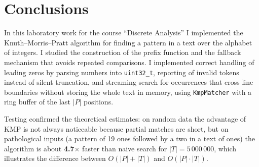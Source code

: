 \section{Conclusions}

In this laboratory work for the course \enquote{Discrete Analysis}
I implemented the Knuth--Morris--Pratt algorithm for finding a pattern in a text over the
alphabet of integers. I studied the construction of the prefix function and the fallback
mechanism that avoids repeated comparisons. I implemented correct handling of leading zeros
by parsing numbers into \texttt{uint32\_t}, reporting of invalid tokens instead of silent
truncation, and streaming search for occurrences that cross line boundaries without storing
the whole text in memory, using \texttt{KmpMatcher} with a ring buffer of the last $|P|$ positions.

Testing confirmed the theoretical estimates: on random data the advantage of KMP is not always
noticeable because partial matches are short, but on pathological inputs
(a pattern of 19 ones followed by a two in a text of ones) the algorithm is
about \textbf{4.7$\times$} faster than naive search for $|T| = 5\,000\,000$,
which illustrates the difference between $O(|P| + |T|)$ and $O(|P| \cdot |T|)$.

\pagebreak
